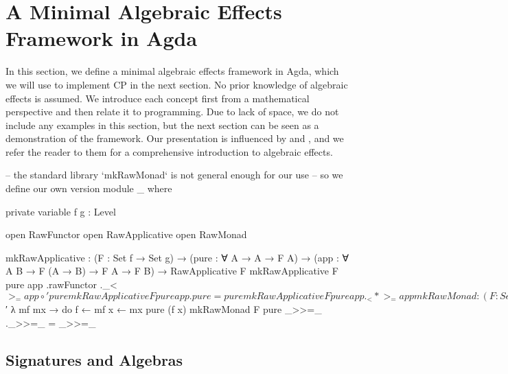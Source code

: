 \section{A Minimal Algebraic Effects Framework in Agda}
\label{sec:alg-eff-agda}

In this section, we define a minimal algebraic effects framework in Agda, which we will use to implement CP in the next section.
%
No prior knowledge of algebraic effects is assumed.
%
We introduce each concept first from a mathematical perspective and then relate it to programming.
%
Due to lack of space, we do not include any examples in this section, but the next section can be seen as a demonstration of the framework.
%
Our presentation is influenced by \citet{bauer-2019} and \citet{kidney-2023}, and we refer the reader to them for a comprehensive introduction to algebraic effects.


\begin{code}[hide]
-- the standard library `mkRawMonad` is not general enough for our use
-- so we define our own version
module _ where

  private
    variable
      f g : Level

  open RawFunctor
  open RawApplicative
  open RawMonad

  mkRawApplicative :
    (F : Set f → Set g) →
    (pure : ∀ {A} → A → F A) →
    (app : ∀ {A B} → F (A → B) → F A → F B) →
    RawApplicative F
  mkRawApplicative F pure app .rawFunctor ._<$>_ = app ∘′ pure
  mkRawApplicative F pure app .pure = pure
  mkRawApplicative F pure app ._<*>_ = app

  mkRawMonad :
    (F : Set f → Set g) →
    (pure : ∀ {A} → A → F A) →
    (bind : ∀ {A B} → F A → (A → F B) → F B) →
    RawMonad F
  mkRawMonad F pure _>>=_ .rawApplicative =
    mkRawApplicative _ pure $′ λ mf mx → do
      f ← mf
      x ← mx
      pure (f x)
  mkRawMonad F pure _>>=_ ._>>=_ = _>>=_
\end{code}

\subsection{Signatures and Algebras}

